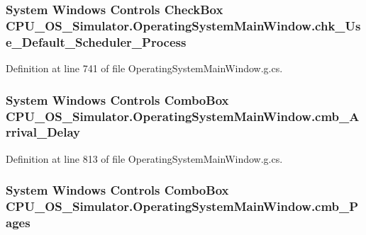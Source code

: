 \subsubsection[{chk\+\_\+\+Use\+\_\+\+Default\+\_\+\+Scheduler\+\_\+\+Process}]{\setlength{\rightskip}{0pt plus 5cm}System Windows Controls Check\+Box C\+P\+U\+\_\+\+O\+S\+\_\+\+Simulator.\+Operating\+System\+Main\+Window.\+chk\+\_\+\+Use\+\_\+\+Default\+\_\+\+Scheduler\+\_\+\+Process\hspace{0.3cm}{\ttfamily [package]}}\label{class_c_p_u___o_s___simulator_1_1_operating_system_main_window_a8af478cc94c72b0c843b4911f43aecdf}


Definition at line 741 of file Operating\+System\+Main\+Window.\+g.\+cs.

\hypertarget{class_c_p_u___o_s___simulator_1_1_operating_system_main_window_ad4e310b5bbd70de23e9132fb57229c96}{}
\subsubsection[{cmb\+\_\+\+Arrival\+\_\+\+Delay}]{\setlength{\rightskip}{0pt plus 5cm}System Windows Controls Combo\+Box C\+P\+U\+\_\+\+O\+S\+\_\+\+Simulator.\+Operating\+System\+Main\+Window.\+cmb\+\_\+\+Arrival\+\_\+\+Delay\hspace{0.3cm}{\ttfamily [package]}}\label{class_c_p_u___o_s___simulator_1_1_operating_system_main_window_ad4e310b5bbd70de23e9132fb57229c96}


Definition at line 813 of file Operating\+System\+Main\+Window.\+g.\+cs.

\hypertarget{class_c_p_u___o_s___simulator_1_1_operating_system_main_window_ab8bcdf83f7bfdecbdd3f8ba71cc92a5e}{}
\subsubsection[{cmb\+\_\+\+Pages}]{\setlength{\rightskip}{0pt plus 5cm}System Windows Controls Combo\+Box C\+P\+U\+\_\+\+O\+S\+\_\+\+Simulator.\+Operating\+System\+Main\+Window.\+cmb\+\_\+\+Pages\hspace{0.3cm}{\ttfamily [package]}}\label{class_c_p_u___o_s___simulator_1_1_operating_system_main_window_ab8bcdf83f7bfdecbdd3f8ba71cc92a5e}


